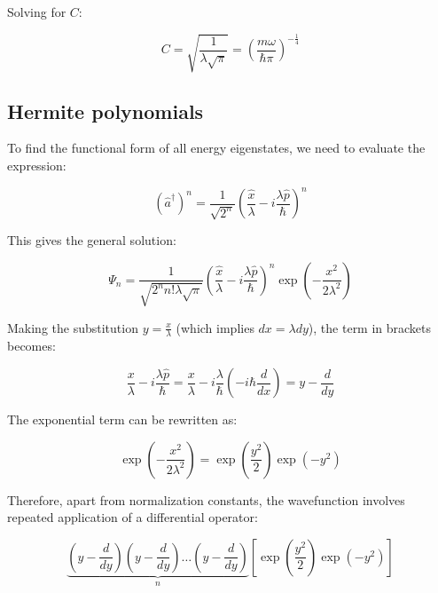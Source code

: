 \documentclass[italian]{HKNdocument}
\begin{document}
Solving for $C$:

\begin{equation}
C = \sqrt{\frac{1}{\lambda\sqrt{\pi}}} = \left(\frac{m\omega}{\hbar\pi}\right)^{-\frac{1}{4}} \label{eq:5.43}
\end{equation}

\subsection{Hermite polynomials}

To find the functional form of all energy eigenstates, we need to evaluate the expression:

\begin{equation}
(\hat{a}^\dagger)^n = \frac{1}{\sqrt{2^n}}\left(\frac{\hat{x}}{\lambda} - i\frac{\lambda\hat{p}}{\hbar}\right)^n \label{eq:5.44}
\end{equation}

This gives the general solution:

\begin{equation}
\Psi_n = \frac{1}{\sqrt{2^n n!\lambda\sqrt{\pi}}}\left(\frac{\hat{x}}{\lambda} - i\frac{\lambda\hat{p}}{\hbar}\right)^n\exp\left(-\frac{x^2}{2\lambda^2}\right) \label{eq:5.45}
\end{equation}

Making the substitution $y = \frac{x}{\lambda}$ (which implies $dx = \lambda dy$), the term in brackets becomes:

\begin{equation}
\frac{x}{\lambda} - i\frac{\lambda\hat{p}}{\hbar} = \frac{x}{\lambda} - i\frac{\lambda}{\hbar}\left(-i\hbar\frac{d}{dx}\right) = y - \frac{d}{dy} \label{eq:5.46}
\end{equation}

The exponential term can be rewritten as:

\begin{equation}
\exp\left(-\frac{x^2}{2\lambda^2}\right) = \exp\left(\frac{y^2}{2}\right)\exp(-y^2) \label{eq:5.47}
\end{equation}

Therefore, apart from normalization constants, the wavefunction involves repeated application of a differential operator:

\begin{equation}
\underbrace{\left(y - \frac{d}{dy}\right)\left(y - \frac{d}{dy}\right)\ldots\left(y - \frac{d}{dy}\right)}_{n}\left[\exp\left(\frac{y^2}{2}\right)\exp(-y^2)\right] \label{eq:5.48}
\end{equation}
\end{document}
